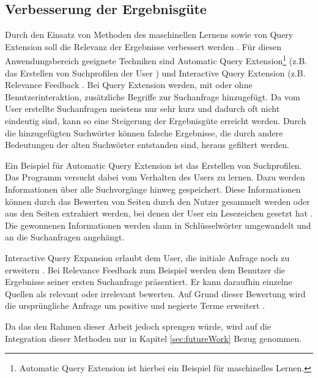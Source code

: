  \subsection{Verbesserung der Ergebnisgüte}
 Durch den Einsatz von Methoden des maschinellen Lernens sowie von Query Extension soll die Relevanz der Ergebnisse verbessert werden \cite{ruthven2003re}. Für diesen Anwendungsbereich geeignete Techniken sind Automatic Query Extension\footnote{Automatic Query Extension ist hierbei ein Beispiel für maschinelles Lernen.} (z.B. das Erstellen von Suchprofilen der User \cite{budzik2000user}) und Interactive Query Extension (z.B. Relevance Feedback \cite{harman1988towards}. Bei Query Extension werden, mit oder ohne Benutzerinteraktion, zusätzliche Begriffe zur Suchanfrage hinzugefügt. Da vom User erstellte Suchanfragen meistens nur sehr kurz \cite{ruthven2003re} und dadurch oft nicht eindeutig sind, kann so eine Steigerung der Ergebnisgüte erreicht werden. Durch die hinzugefügten Suchwörter können falsche Ergebnisse, die durch andere Bedeutungen der alten Suchwörter entstanden sind, heraus gefiltert werden.

 Ein Beispiel für Automatic Query Extension ist das Erstellen von Suchprofilen. Das Programm versucht dabei vom Verhalten des Users zu lernen. Dazu werden Informationen über alle Suchvorgänge hinweg gespeichert. Diese Informationen können durch das Bewerten von Seiten durch den Nutzer gesammelt werden oder aus den Seiten extrahiert werden, bei denen der User ein Lesezeichen gesetzt hat \cite{budzik2000user}. Die gewonnenen Informationen werden dann in Schlüsselwörter umgewandelt und an die Suchanfragen angehängt.

 Interactive Query Expansion erlaubt dem User, die initiale Anfrage noch zu erweitern \cite{harman1988towards}. Bei Relevance Feedback zum Beispiel werden dem Benutzer die Ergebnisse seiner ersten Suchanfrage präsentiert. Er kann daraufhin einzelne Quellen als relevant oder irrelevant bewerten. Auf Grund dieser Bewertung wird die ursprüngliche Anfrage um positive und negierte Terme erweitert \cite{budzik2000user}.

 Da das den Rahmen dieser Arbeit jedoch sprengen würde, wird auf die Integration dieser Methoden nur in Kapitel \ref{sec:futureWork} Bezug genommen.